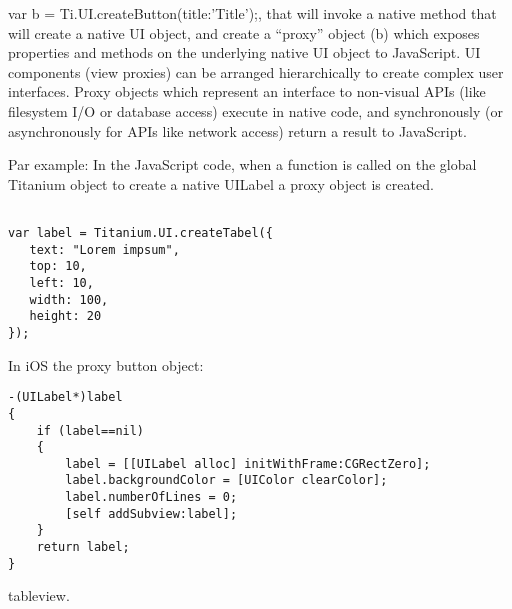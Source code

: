 var b = Ti.UI.createButton({title:'Title'});, that will invoke a native method that will create a native UI object, and create a “proxy” object (b) which exposes properties and methods on the underlying native UI object to JavaScript.
UI components (view proxies) can be arranged hierarchically to create complex user interfaces. Proxy objects which represent an interface to non-visual APIs (like filesystem I/O or database access) execute in native code, and synchronously (or asynchronously for APIs like network access) return a result to JavaScript. 


Par example: In the JavaScript code, when a function is called on the global Titanium object to create a native UILabel a proxy object is created.

\begin{verbatim}

var label = Titanium.UI.createTabel({
   text: "Lorem impsum",
   top: 10,
   left: 10,
   width: 100,
   height: 20
});
\end{verbatim}


In iOS the proxy button object:

\begin{verbatim}
-(UILabel*)label
{
    if (label==nil)
    {
        label = [[UILabel alloc] initWithFrame:CGRectZero];
        label.backgroundColor = [UIColor clearColor];
        label.numberOfLines = 0;
        [self addSubview:label];
    }
    return label;
}
\end{verbatim}




tableview.

